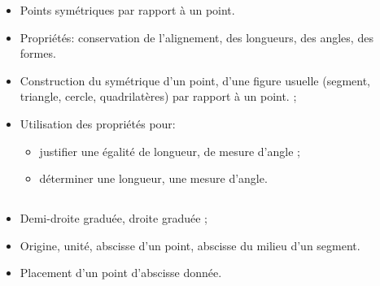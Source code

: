 \savoir
\begin{itemize}
\item Points symétriques par rapport à un point.
\item Propriétés: conservation de l'alignement, des longueurs, des angles, des formes.
\end{itemize}
\savoirfaire
\begin{itemize}
\item Construction du symétrique d'un point, d'une figure usuelle (segment, triangle, cercle, quadrilatères) par rapport à un point. ;
\item  Utilisation des propriétés pour:
\begin{itemize}
\item justifier une égalité de longueur, de mesure d'angle ; 
\item déterminer une longueur, une mesure d'angle.
\end{itemize}  
\end{itemize}

\subsection*{}

\savoir
\begin{itemize}
\item Demi-droite graduée, droite graduée ;
\item Origine, unité, abscisse d'un point, abscisse du milieu d'un segment.
\end{itemize}
\savoirfaire
\begin{itemize}
\item Placement d'un point d'abscisse donnée.  
\end{itemize}